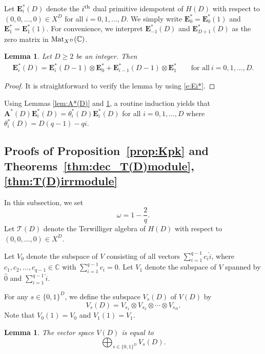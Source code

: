 \documentclass[10pt,a4paper]{amsart}
\def\A{\mathbf A}
\def\E{\mathbf E}
\def\C{\mathbb C}
\def\Mat{{\rm Mat}}
\def\T{\mathcal T}
\numberwithin{equation}{section}
\newtheorem{Lemma}[Theorem]{Lemma}
\begin{document}
Let $\E_i^*(D)$ denote the $i^{{\rm th}}$ dual primitive idempotent of $H(D)$ with respect to ${(0,0,\dots,0)\!\in\! X^D}$ for all $i=0,1,\dots,D$. We simply write $\E^*_0=\E^*_0(1)$ and $\E^*_1=\E^*_1(1)$. For convenience, we interpret $\E_{-1}^*(D)$ and $\E_{D+1}^*(D)$ as the zero matrix in $\Mat_{X^D}(\C)$.

\begin{Lemma}\label{lem:Ei*(D)}
Let $D\geq 2$ be an integer. Then
\begin{gather*}
\E_i^*(D)=\E_i^*(D-1)\otimes \E^*_0+\E_{i-1}^*(D-1)\otimes \E_1^*
\qquad
\text{for all}\ i=0,1,\dots,D.
\end{gather*}
\end{Lemma}
\begin{proof}
It is straightforward to verify the lemma by using \eqref{e:Ei*}.
\end{proof}

Using Lemmas \ref{lem:A*(D)} and \ref{lem:Ei*(D)}, a routine induction yields that $\A^*(D) \E_i^*(D)=\theta_i^*(D)\E_i^*(D)$ for all $i=0,1,\dots,D$ where
$\theta_i^*(D)=D(q-1)-qi$.

\subsection{Proofs of Proposition~\ref{prop:Kpk} and Theorems~\ref{thm:dec_T(D)module}, \ref{thm:T(D)irrmodule}}

In this subsection, we set
\[
\omega=1-\frac{2}{q}.
\]
Let $\T(D)$ denote the Terwilliger algebra of $H(D)$ with respect to $(0,0,\dots,0)\in X^D$.

\begin{Definition}\label{defn:V0&V1}
Let $V_0$ denote the subspace of $V$ consisting of all vectors $\sum_{i=1}^{q-1} c_i \hat i$, where $c_1,c_2,\dots,c_{q-1}\in \C$ with $\sum_{i=1}^{q-1} c_i=0$.
Let $V_1$ denote the subspace of $V$ spanned by
$\hat 0$ and $\sum_{i=1}^{q-1} \hat i$.
\end{Definition}

\begin{Definition}\label{defn:Vs(D)}
For any $s\in \{0,1\}^D$, we define the subspace $V_s(D)$ of $V(D)$ by
\[
V_s(D)=V_{s_1}\otimes V_{s_2}\otimes \cdots \otimes V_{s_D}.
\]
Note that $V_0(1)=V_0$ and $V_1(1)=V_1$.
\end{Definition}

\begin{Lemma}\label{lem:decV(D)_HD}
The vector space $V(D)$ is equal to
\[
\bigoplus_{s\in \{0,1\}^D} V_s(D).
\]
\end{Lemma}
\end{document}
